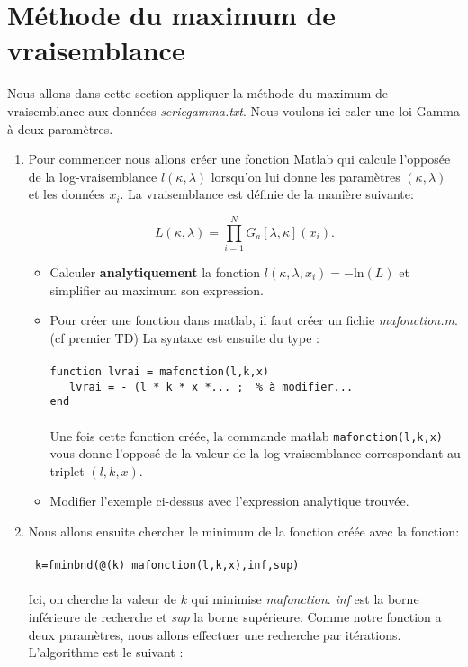 \documentclass[a4paper]{article}
\begin{document}
 \section{Méthode du maximum de vraisemblance}	
 
Nous allons dans cette section appliquer la méthode du maximum de vraisemblance aux données \textit{seriegamma.txt}. Nous voulons ici caler une loi Gamma à deux paramètres.
\begin{enumerate}
\item  Pour commencer nous allons créer une fonction Matlab qui calcule l'opposée de la log-vraisemblance $l(\kappa,\lambda)$ lorsqu'on lui donne les paramètres $(\kappa,\lambda)$ et les données $x_i$. La vraisemblance est définie de la manière suivante:

\begin{equation*}
L(\kappa,\lambda) = \prod_{i=1}^N G_a[\lambda,\kappa](x_i).
\end{equation*}
  
\begin{itemize}
\item Calculer \textbf{analytiquement} la fonction $l(\kappa,\lambda,x_i)=-$ln$(L)$ et simplifier au maximum son expression.
\item Pour créer une fonction dans matlab, il faut créer un fichie \textit{mafonction.m}. (cf premier TD) La syntaxe est ensuite du type :\\~\\
    \verb!function lvrai = mafonction(l,k,x)!\\
    \verb!   lvrai = - (l * k * x *... ;  % à modifier... !\\
    \verb!end!\\~\\
Une fois cette fonction créée, la commande matlab \texttt{mafonction(l,k,x)} vous donne l'opposé de la valeur de la log-vraisemblance correspondant au triplet $(l,k,x)$.

\item Modifier l'exemple ci-dessus avec l'expression analytique trouvée.\\

\end{itemize}
    
\item Nous allons ensuite chercher le minimum de la fonction créée avec la fonction: \\~\\ \verb! k=fminbnd(@(k) mafonction(l,k,x),inf,sup) !\\~\\ Ici, on cherche la valeur de $k$ qui minimise \textit{mafonction}. \textit{inf} est la borne inférieure de recherche et \textit{sup} la borne supérieure. Comme notre fonction a deux paramètres, nous allons effectuer une recherche par itérations. L'algorithme est le suivant :\\


\end{enumerate}
\end{document}
